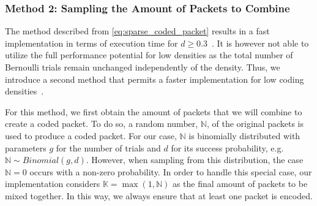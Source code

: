 \subsubsection{Method 2: Sampling the Amount of Packets to Combine}
The method described from \eqref{eq:sparse_coded_packet} results
in a fast implementation in terms of execution time for
$d \geq 0.3$~\cite{practicalview_tsnc2015}.
It is however not able to utilize the full performance potential for
low densities as the total number of Bernoulli trials remain unchanged
independently of the density.
Thus, we introduce a second method that permits a faster implementation
for low coding densities~\cite{practicalview_tsnc2015}.

For this method, we first obtain the amount of packets
that we will combine to create a coded packet. To do so, a random
number, $\mathbb{N}$, of the original packets is used to produce a
coded packet. For our case, $\mathbb{N}$ is binomially distributed
with parameters $g$ for the number of trials and $d$ for its success
probability, e.g. $\mathbb{N} \sim Binomial(g,d)$. However,
when sampling from this distribution, the case
$\mathbb{N} = 0$ occurs with a non-zero probability. In order to handle
this special case, our implementation considers
$\mathbb{K} = \max(1,\mathbb{N})$ as the final amount of packets to be
mixed together. In this way, we always ensure that at least one packet is
encoded.

